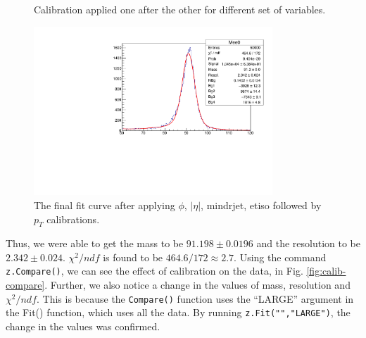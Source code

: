\documentclass[a4paper]{report}
\numberwithin{equation}{section}
\begin{document}
\begin{figure}[htb!]
	\quad
	\centering
	\caption{Calibration applied one after the other for different set of variables.}
	\label{fig:calib-process}
\end{figure}

\begin{figure}[htpb]
    \centering
    \includegraphics[width=0.8\textwidth]{final_calib_fit}
    \caption{The final fit curve after applying $\phi$, $|\eta|$, mindrjet, etiso followed by $p_T$ calibrations.}
    \label{fig:final-calib}
\end{figure}

Thus, we were able to get the mass to be $91.198 \pm 0.0196$ and the resolution to be $2.342 \pm 0.024$. $\chi^2/ndf$ is found to be $464.6 / 172 \approx 2.7$. Using the command \texttt{z.Compare()}, we can see the effect of calibration on the data, in Fig. \ref{fig:calib-compare}. Further, we also notice a change in the values of mass, resolution and $\chi^2/ndf$. This is because the \texttt{Compare()} function uses the ``LARGE'' argument in the Fit() function, which uses all the data. By running \texttt{z.Fit("","LARGE")}, the change in the values was confirmed. 
\end{document}
